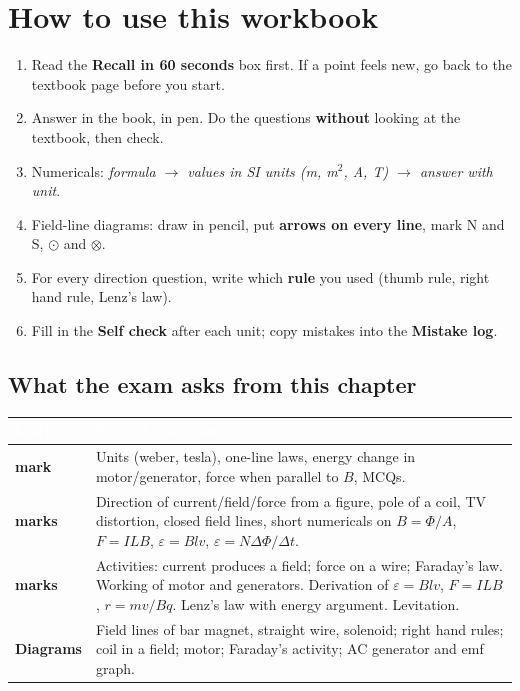 \documentclass[11pt,a4paper]{article}
\newcounter{unit}
\begin{document}
\section*{\sffamily\color{ecblue}How to use this workbook}
\begin{enumerate}[label=\textcolor{ecorange}{\faArrowRight},leftmargin=6mm]
\item Read the \textbf{Recall in 60 seconds} box first. If a point feels new, go back to the textbook page before you start.
\item Answer in the book, in pen. Do the questions \textbf{without} looking at the textbook, then check.
\item Numericals: \emph{formula $\rightarrow$ values in SI units (m, m$^2$, A, T) $\rightarrow$ answer with unit}.
\item Field-line diagrams: draw in pencil, put \textbf{arrows on every line}, mark N and S, $\odot$ and $\otimes$.
\item For every direction question, write which \textbf{rule} you used (thumb rule, right hand rule, Lenz's law).
\item Fill in the \textbf{Self check} after each unit; copy mistakes into the \textbf{Mistake log}.
\end{enumerate}

\subsection*{\sffamily\color{ecblue}What the exam asks from this chapter}
\renewcommand{\arraystretch}{1.35}
\begin{tabularx}{\linewidth}{>{\bfseries\sffamily}p{1.6cm}X}
\toprule
\rowcolor{ecblue}\textcolor{white}{Marks} & \textcolor{white}{\textbf{\sffamily Typical questions}}\\
\midrule
1 mark & Units (weber, tesla), one-line laws, energy change in motor/generator, force when parallel to $B$, MCQs.\\
2 marks & Direction of current/field/force from a figure, pole of a coil, TV distortion, closed field lines, short numericals on $B=\Phi/A$, $F=ILB$, $\varepsilon=Blv$, $\varepsilon=N\Delta\Phi/\Delta t$.\\
4 marks & Activities: current produces a field; force on a wire; Faraday's law. Working of motor and generators. Derivation of $\varepsilon=Blv$, $F=ILB$, $r=mv/Bq$. Lenz's law with energy argument. Levitation.\\
Diagrams & Field lines of bar magnet, straight wire, solenoid; right hand rules; coil in a field; motor; Faraday's activity; AC generator and emf graph.\\
\bottomrule
\end{tabularx}
\end{document}
